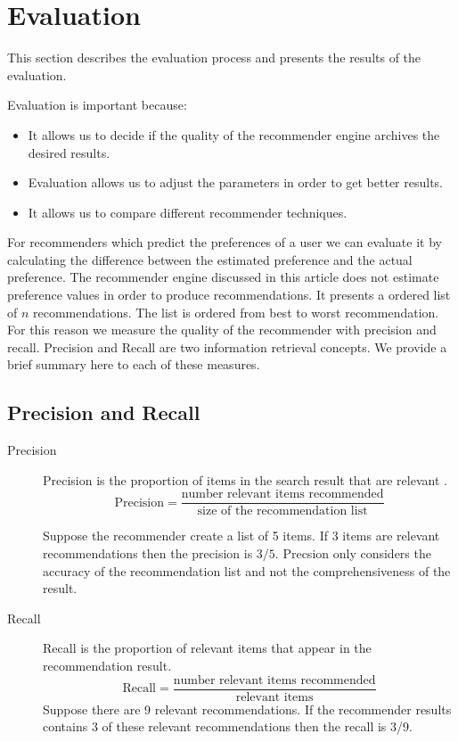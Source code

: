 
\section{Evaluation}
\label{sec:evaluation}

This section describes the evaluation process and presents the results of the evaluation.

Evaluation is important because:
\begin{itemize}
  \item It allows us to decide if the quality of the recommender engine archives the desired results.
  \item Evaluation allows us to adjust the parameters in order to get better results.
  \item It allows us to compare different recommender techniques.
\end{itemize}

For recommenders which predict the preferences of a user we can evaluate it by calculating the difference between the estimated preference and the actual preference.
The recommender engine discussed in this article does not estimate preference values in order to produce recommendations. It presents a ordered list of $n$ recommendations. The list is ordered from best to worst recommendation. For this reason we measure the quality of the recommender with precision and recall. Precision and Recall are two information retrieval concepts. We provide a brief summary here to each of these measures.

\subsection{Precision and Recall}
\label{sec:precision}

\begin{description}
\item[Precision] Precision is the proportion of items in the search result that are relevant \cite{Manning}.
  \begin{equation}
    \label{eq:precision}
    \text{Precision} = \frac{\text{number relevant items recommended}}{\text{size of the recommendation list}}
  \end{equation}

 Suppose the recommender create a list of 5 items. If 3 items are relevant recommendations then the precision is $3/5$. 
Precsion only considers the accuracy of the recommendation list and not the comprehensiveness of the result.
\item[Recall] Recall is the proportion of relevant items that appear in the recommendation result. 
  \begin{equation}
    \label{eq:precision}
    \text{Recall} = \frac{\text{number relevant items recommended}}{\text{relevant items}}
  \end{equation}
Suppose there are 9 relevant recommendations. If the recommender results contains 3 of these relevant recommendations then the recall is 3/9.
\end{description}

